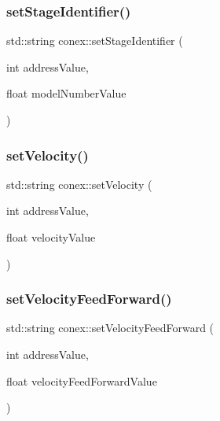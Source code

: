 \mbox{\label{namespaceconex_a81886be7ef4e25e26a4a222d4716ea7f}} 
\subsubsection{\texorpdfstring{set\+Stage\+Identifier()}{setStageIdentifier()}}
{\footnotesize\ttfamily std\+::string conex\+::set\+Stage\+Identifier (\begin{DoxyParamCaption}\item[{int}]{address\+Value,  }\item[{float}]{model\+Number\+Value }\end{DoxyParamCaption})}

\mbox{\label{namespaceconex_aa970ffa1a5a264c97b5e821e1dedf0f0}} 
\subsubsection{\texorpdfstring{set\+Velocity()}{setVelocity()}}
{\footnotesize\ttfamily std\+::string conex\+::set\+Velocity (\begin{DoxyParamCaption}\item[{int}]{address\+Value,  }\item[{float}]{velocity\+Value }\end{DoxyParamCaption})}

\mbox{\label{namespaceconex_a5bcb38c3b971ccf0f2c03794ae16798c}} 
\subsubsection{\texorpdfstring{set\+Velocity\+Feed\+Forward()}{setVelocityFeedForward()}}
{\footnotesize\ttfamily std\+::string conex\+::set\+Velocity\+Feed\+Forward (\begin{DoxyParamCaption}\item[{int}]{address\+Value,  }\item[{float}]{velocity\+Feed\+Forward\+Value }\end{DoxyParamCaption})}

